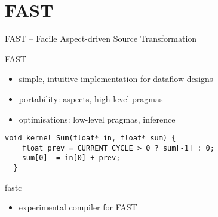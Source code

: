 \section{FAST}

\begin{frame}[fragile]{FAST -- Facile Aspect-driven Source Transformation}
  \begin{beamerboxesrounded}{FAST}
  \begin{itemize}
  \item simple, intuitive implementation for dataflow designs
  \item portability: aspects, high level pragmas
  \item optimisations: low-level pragmas, inference
  \end{itemize}

  \begin{lstlisting}[style=MaxC,   basicstyle=\scriptsize]
  void kernel_Sum(float* in, float* sum) {
    float prev = CURRENT_CYCLE > 0 ? sum[-1] : 0;
    sum[0]  = in[0] + prev;
  }
  \end{lstlisting}
  \end{beamerboxesrounded}

  \begin{beamerboxesrounded}{fastc}
    \begin{itemize}
      \item experimental compiler for FAST
    \end{itemize}
    \vspace{-0.5cm}
    \begin{figure}[!ht]
      \centering
      \def\svgwidth{\linewidth}
      
      \label{fastcc}
    \end{figure}
   \end{beamerboxesrounded}
\end{frame}